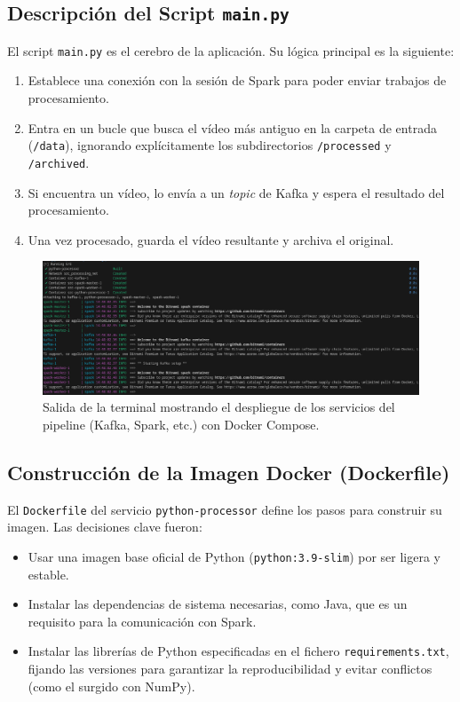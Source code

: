 \subsection{Descripción del Script \texttt{main.py}}
El script \texttt{main.py} es el cerebro de la aplicación. Su lógica principal es la siguiente:
\begin{enumerate}
    \item Establece una conexión con la sesión de Spark para poder enviar trabajos de procesamiento.
    \item Entra en un bucle que busca el vídeo más antiguo en la carpeta de entrada (\texttt{/data}), ignorando explícitamente los subdirectorios \texttt{/processed} y \texttt{/archived}.
    \item Si encuentra un vídeo, lo envía a un \textit{topic} de Kafka y espera el resultado del procesamiento.
    \item Una vez procesado, guarda el vídeo resultante y archiva el original.
\end{enumerate}

\begin{figure}[H]
    \centering
    \includegraphics[width=\textwidth]{img/montarsparkkafka.png}
    \caption{Salida de la terminal mostrando el despliegue de los servicios del pipeline (Kafka, Spark, etc.) con Docker Compose.}
    \label{fig:apendice_d_compose_up}
\end{figure}

\subsection{Construcción de la Imagen Docker (Dockerfile)}
El \texttt{Dockerfile} del servicio \texttt{python-processor} define los pasos para construir su imagen. Las decisiones clave fueron:
\begin{itemize}
    \item Usar una imagen base oficial de Python (\texttt{python:3.9-slim}) por ser ligera y estable.
    \item Instalar las dependencias de sistema necesarias, como Java, que es un requisito para la comunicación con Spark.
    \item Instalar las librerías de Python especificadas en el fichero \texttt{requirements.txt}, \\ fijando las versiones para garantizar la reproducibilidad y evitar conflictos (como el surgido con NumPy).
\end{itemize}

